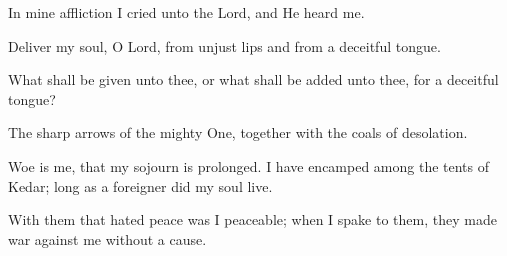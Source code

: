 In mine affliction I cried unto the Lord, and He heard me.

Deliver my soul, O Lord, from unjust lips and from a deceitful tongue.

What shall be given unto thee, or what shall be added unto thee, for a deceitful tongue?

The sharp arrows of the mighty One, together with the coals of desolation.

Woe is me, that my sojourn is prolonged. I have encamped among the tents of Kedar; long as a foreigner did my soul live.

With them that hated peace was I peaceable; when I spake to them, they made war against me without a cause.
